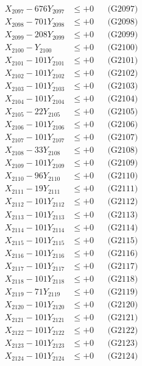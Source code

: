 \documentclass[a4paper,10pt]{article}
\begin{document}
{\begin{align}
X_{2097} - 676Y_{2097} &\leq +0 && \text{(G2097)} \\
X_{2098} - 701Y_{2098} &\leq +0 && \text{(G2098)} \\
X_{2099} - 208Y_{2099} &\leq +0 && \text{(G2099)} \\
X_{2100} - Y_{2100} &\leq +0 && \text{(G2100)} \\
\allowbreak
X_{2101} - 101Y_{2101} &\leq +0 && \text{(G2101)} \\
X_{2102} - 101Y_{2102} &\leq +0 && \text{(G2102)} \\
X_{2103} - 101Y_{2103} &\leq +0 && \text{(G2103)} \\
X_{2104} - 101Y_{2104} &\leq +0 && \text{(G2104)} \\
X_{2105} - 22Y_{2105} &\leq +0 && \text{(G2105)} \\
X_{2106} - 101Y_{2106} &\leq +0 && \text{(G2106)} \\
X_{2107} - 101Y_{2107} &\leq +0 && \text{(G2107)} \\
X_{2108} - 33Y_{2108} &\leq +0 && \text{(G2108)} \\
X_{2109} - 101Y_{2109} &\leq +0 && \text{(G2109)} \\
X_{2110} - 96Y_{2110} &\leq +0 && \text{(G2110)} \\
\allowbreak
X_{2111} - 19Y_{2111} &\leq +0 && \text{(G2111)} \\
X_{2112} - 101Y_{2112} &\leq +0 && \text{(G2112)} \\
X_{2113} - 101Y_{2113} &\leq +0 && \text{(G2113)} \\
X_{2114} - 101Y_{2114} &\leq +0 && \text{(G2114)} \\
X_{2115} - 101Y_{2115} &\leq +0 && \text{(G2115)} \\
X_{2116} - 101Y_{2116} &\leq +0 && \text{(G2116)} \\
X_{2117} - 101Y_{2117} &\leq +0 && \text{(G2117)} \\
X_{2118} - 101Y_{2118} &\leq +0 && \text{(G2118)} \\
X_{2119} - 71Y_{2119} &\leq +0 && \text{(G2119)} \\
X_{2120} - 101Y_{2120} &\leq +0 && \text{(G2120)} \\
\allowbreak
X_{2121} - 101Y_{2121} &\leq +0 && \text{(G2121)} \\
X_{2122} - 101Y_{2122} &\leq +0 && \text{(G2122)} \\
X_{2123} - 101Y_{2123} &\leq +0 && \text{(G2123)} \\
X_{2124} - 101Y_{2124} &\leq +0 && \text{(G2124)} \\

\end{align}}
\end{document}
